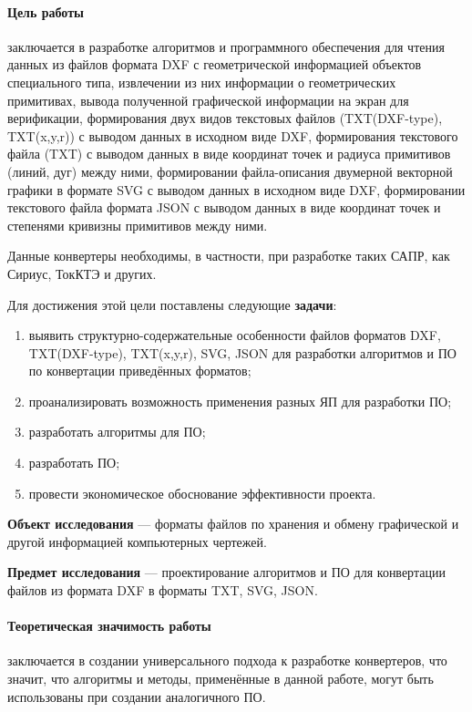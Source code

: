 \paragraph{Цель работы} заключается в разработке алгоритмов и программного обеспечения для чтения данных из файлов формата DXF с геометрической информацией объектов специального типа, извлечении из них информации о геометрических примитивах, вывода полученной графической информации на экран для верификации, формирования двух видов текстовых файлов (TXT(DXF-type), TXT(x,y,r)) с выводом данных в исходном виде DXF, формирования текстового файла (TXT) с выводом данных в виде координат точек и радиуса примитивов (линий, дуг) между ними, формировании файла-описания двумерной векторной графики в формате SVG с выводом данных в исходном виде DXF, формировании текстового файла формата JSON с выводом данных в виде координат точек и степенями кривизны примитивов между ними.

Данные конвертеры необходимы, в частности, при разработке таких САПР, как Сириус, ТокКТЭ и других.

Для достижения этой цели поставлены следующие \textbf{задачи}:

\begin{enumerate}[1)]
	\item выявить структурно-содержательные особенности файлов форматов DXF, TXT(DXF-type), TXT(x,y,r), SVG, JSON для разработки алгоритмов и ПО по конвертации приведённых форматов;
	\item проанализировать возможность применения разных ЯП для разработки ПО;
	\item разработать алгоритмы для ПО;
	\item разработать ПО;
	\item провести экономическое обоснование эффективности проекта.
\end{enumerate}

\textbf{Объект исследования} --- форматы файлов по хранения и обмену графической и другой информацией компьютерных чертежей.

\textbf{Предмет исследования} --- проектирование алгоритмов и ПО для конвертации файлов из формата DXF в форматы TXT, SVG, JSON.

\paragraph{Теоретическая значимость работы} заключается в создании универсального подхода к разработке конвертеров, что значит, что алгоритмы и методы, применённые в данной работе, могут быть использованы при создании аналогичного ПО.

